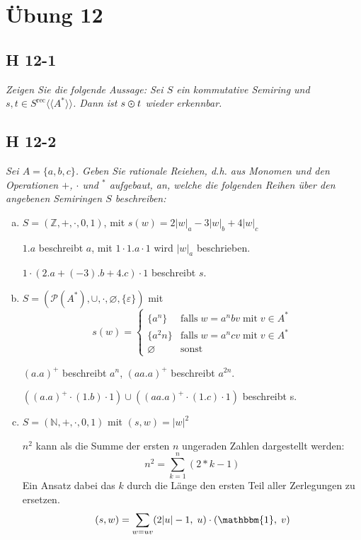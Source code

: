 \documentclass{scrartcl}
\begin{document}
\section{Übung 12}

\subsection{H 12-1}

\textsl{Zeigen Sie die folgende Aussage: Sei $S$ ein kommutative Semiring und $s, t \in S^{\text{rec}}\langle\langle A^* \rangle\rangle$. Dann ist $s \varodot t$ wieder erkennbar.}

\subsection{H 12-2}

\textsl{Sei $A = \{a, b, c\}$. Geben Sie rationale Reiehen, d.h. aus Monomen und den Operationen $+$, $\cdot$ und ${}^*$ aufgebaut, an, welche die folgenden Reihen über den angebenen Semiringen $S$ beschreiben:}

\begin{enumerate}[(a)]
    \item $S = (\mathbb{Z}, +, \cdot, 0, 1)$, mit $s(w) = 2|w|_a -3|w|_b + 4|w|_c$

      $1.a$ beschreibt $a$, mit $1 \cdot 1.a \cdot 1$ wird $|w|_a$ beschrieben.

      $1 \cdot \left(2.a + \left(-3\right).b + 4.c\right) \cdot 1$ beschreibt $s$.

    \item $S = (\mathcal{P}(A^*), \cup, \cdot, \varnothing, \{\varepsilon\})$ mit
      \begin{equation*}
        s(w) = \begin{cases}
          \{a^n\}     &\text{falls}\;w = a^nbv\;\text{mit}\;v \in A^*\\
          \{a^2n\}    &\text{falls}\;w=a^ncv\;\text{mit}\;v \in A^*\\
          \varnothing &\text{sonst}
        \end{cases}
      \end{equation*}

      $(a.a)^+$ beschreibt $a^n$, $(aa.a)^+$ beschreibt $a^{2n}$.

      $\left(\left(a.a\right)^+ \cdot \left(1.b\right) \cdot 1\right) \cup \left(\left(aa.a\right)^+ \cdot \left(1.c\right) \cdot 1\right)$ beschreibt s.

    \item $S = (\mathbb{N}, +, \cdot, 0, 1)$ mit $(s, w) = |w|^2$

    $n^2$ kann als die Summe der ersten $n$ ungeraden Zahlen dargestellt werden:
    $$
    n^2 = \sum^n_{k=1} (2*k-1)
    $$
    Ein Ansatz dabei das $k$ durch die Länge den ersten Teil aller Zerlegungen zu ersetzen.
    \begin{align*}
      (s, w) = \sum_{w=uv} (2|u|-1,\;u)\cdot(\mathbbm{1},\;v)
    \end{align*}
\end{enumerate}
\end{document}
